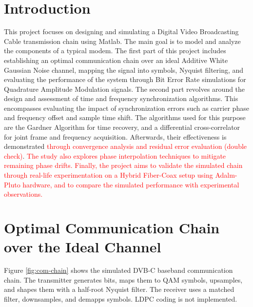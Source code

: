 \documentclass[11pt]{article}
\begin{document}
	\justifying %
	
	\tableofcontents
	\newpage
	\listoffigures
	
	\newpage
	\section*{Introduction}{}
	This project focuses on designing and simulating a Digital Video Broadcasting Cable transmission chain using Matlab.
	The main goal is to model and analyze the components of a typical modem. The first part of this project includes establishing an optimal communication chain over an ideal Additive White Gaussian Noise channel, mapping the signal into symbols, Nyquist filtering, and evaluating the performance of the system through Bit Error Rate simulations for Quadrature Amplitude Modulation signals. The second part revolves around the design and assessment of time and frequency synchronization algorithms. This encompasses evaluating the impact of synchronization errors such as carrier phase and frequency offset and sample time shift. The algorithms used for this purpose are the Gardner Algorithm for time recovery, and a differential cross-correlator for joint frame and frequency acquisition. Afterwards, their effectiveness is demonstrated \textcolor{red}{through convergence analysis and residual error evaluation (double check)}. \textcolor{red}{The study also explores phase interpolation techniques to mitigate remaining phase drifts. Finally, the project aims to validate the simulated chain through real-life experimentation on a Hybrid Fiber-Coax setup using Adalm-Pluto hardware, and to compare the simulated performance with experimental observations.}
	
	
	\section{Optimal Communication Chain over the Ideal Channel}
	Figure \ref{fig:com-chain} shows the simulated DVB-C baseband communication chain. The transmitter generates bits, maps them to QAM symbols, upsamples, and shapes them with a half-root Nyquist filter. The receiver uses a matched filter, downsamples, and demapps symbols. LDPC coding is not implemented.
	
\end{document}
